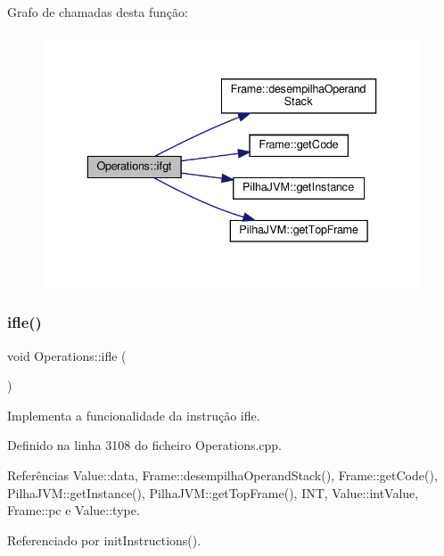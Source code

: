 Grafo de chamadas desta função\+:\nopagebreak
\begin{figure}[H]
\begin{center}
\leavevmode
\includegraphics[width=336pt]{classOperations_afff52b972f58750ea8037aeb02dd22bc_cgraph}
\end{center}
\end{figure}
\mbox{\label{classOperations_a1ef1754372db2e5285a129389274dcc8}} 
\subsubsection{\texorpdfstring{ifle()}{ifle()}}
{\footnotesize\ttfamily void Operations\+::ifle (\begin{DoxyParamCaption}{ }\end{DoxyParamCaption})\hspace{0.3cm}{\ttfamily [private]}}



Implementa a funcionalidade da instrução ifle. 



Definido na linha 3108 do ficheiro Operations.\+cpp.



Referências Value\+::data, Frame\+::desempilha\+Operand\+Stack(), Frame\+::get\+Code(), Pilha\+J\+V\+M\+::get\+Instance(), Pilha\+J\+V\+M\+::get\+Top\+Frame(), I\+NT, Value\+::int\+Value, Frame\+::pc e Value\+::type.



Referenciado por init\+Instructions().

